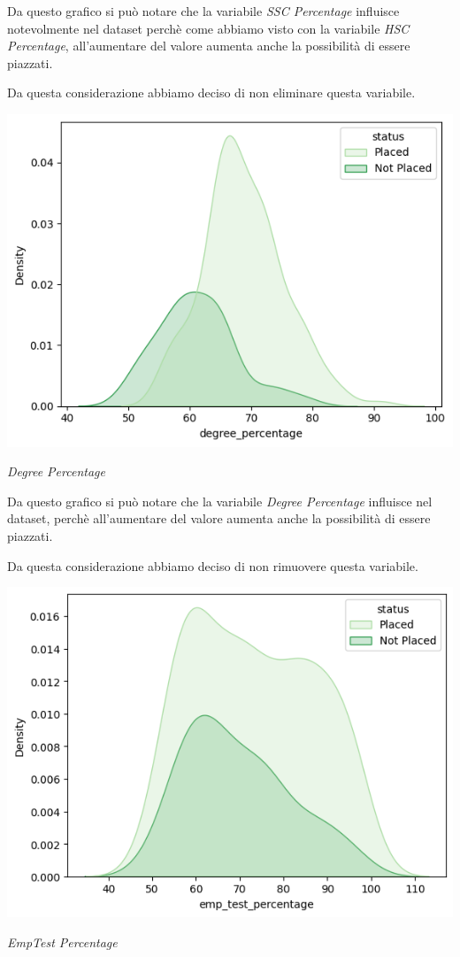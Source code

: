 \documentclass[12pt]{article}
\begin{document}
Da questo grafico si può notare che la variabile \textit{SSC Percentage} influisce notevolmente nel dataset perchè come abbiamo visto con la
variabile \textit{HSC Percentage}, all'aumentare del valore aumenta anche la possibilità di essere piazzati.

Da questa considerazione abbiamo deciso di non eliminare questa variabile.

\begin{center}
    \includegraphics[scale=0.5]{degreepercentage.png}

    \textit{Degree Percentage}
\end{center}

Da questo grafico si può notare che la variabile \textit{Degree Percentage} influisce nel dataset, perchè all'aumentare del valore aumenta anche la possibilità
di essere piazzati.

Da questa considerazione abbiamo deciso di non rimuovere questa variabile.

\begin{center}
    \includegraphics[scale=0.5]{emptestpercentage.png}

    \textit{EmpTest Percentage}
\end{center}
\end{document}
